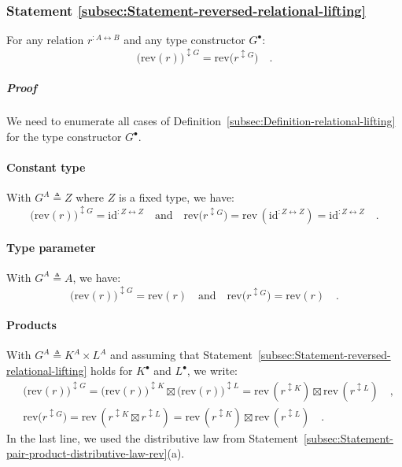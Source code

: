\subsubsection{Statement \label{subsec:Statement-reversed-relational-lifting}\ref{subsec:Statement-reversed-relational-lifting}}

For any relation $r^{:A\leftrightarrow B}$ and any type constructor
$G^{\bullet}$:
\[
\big(\text{rev}\left(r\right)\big)^{\updownarrow G}=\text{rev}\big(r^{\updownarrow G}\big)\quad.
\]


\subparagraph{Proof}

We need to enumerate all cases of Definition~\ref{subsec:Definition-relational-lifting}
for the type constructor $G^{\bullet}$.

\paragraph{Constant type}

With $G^{A}\triangleq Z$ where $Z$ is a fixed type, we have:
\[
\big(\text{rev}\left(r\right)\big)^{\updownarrow G}=\text{id}^{:Z\leftrightarrow Z}\quad\text{and}\quad\text{rev}\big(r^{\updownarrow G}\big)=\text{rev}\,(\text{id}^{:Z\leftrightarrow Z})=\text{id}^{:Z\leftrightarrow Z}\quad.
\]


\paragraph{Type parameter}

With $G^{A}\triangleq A$, we have:
\[
\big(\text{rev}\left(r\right)\big)^{\updownarrow G}=\text{rev}\left(r\right)\quad\text{and}\quad\text{rev}\big(r^{\updownarrow G}\big)=\text{rev}\left(r\right)\quad.
\]


\paragraph{Products}

With $G^{A}\triangleq K^{A}\times L^{A}$ and assuming that Statement~\ref{subsec:Statement-reversed-relational-lifting}
holds for $K^{\bullet}$ and $L^{\bullet}$, we write:
\begin{align*}
 & \big(\text{rev}\left(r\right)\big)^{\updownarrow G}=\big(\text{rev}\left(r\right)\big)^{\updownarrow K}\boxtimes\big(\text{rev}\left(r\right)\big)^{\updownarrow L}=\text{rev}\,(r^{\updownarrow K})\boxtimes\text{rev}\,(r^{\updownarrow L})\quad,\\
 & \text{rev}\big(r^{\updownarrow G}\big)=\text{rev}\,(r^{\updownarrow K}\boxtimes r^{\updownarrow L})=\text{rev}\,(r^{\updownarrow K})\boxtimes\text{rev}\,(r^{\updownarrow L})\quad.
\end{align*}
In the last line, we used the distributive law from Statement~\ref{subsec:Statement-pair-product-distributive-law-rev}(a).

